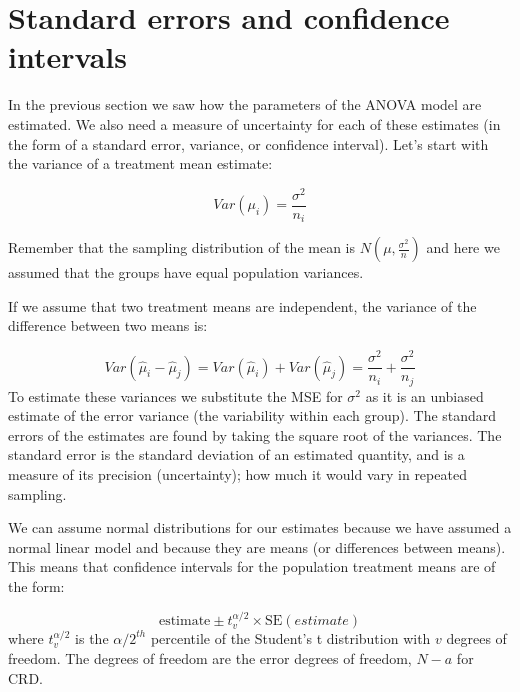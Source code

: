 \documentclass[
  letterpaper,
  DIV=11,
  numbers=noendperiod,
  oneside]{scrreprt}
\begin{document}
\section{Standard errors and confidence
intervals}\label{standard-errors-and-confidence-intervals}

In the previous section we saw how the parameters of the ANOVA model are
estimated. We also need a measure of uncertainty for each of these
estimates (in the form of a standard error, variance, or confidence
interval). Let's start with the variance of a treatment mean estimate:


\[Var(\mu_i) = \frac{\sigma^2}{n_i} \]

Remember that the sampling distribution of the mean is
\(N(\mu,\frac{\sigma^2}{n})\) and here we assumed that the groups have
equal population variances.

If we assume that two treatment means are independent, the variance of
the difference between two means is:

\[
Var(\hat{\mu}_i - \hat{\mu}_j) = Var(\hat{\mu}_i) + Var(\hat{\mu}_j) = \frac{\sigma^2}{n_i} + \frac{\sigma^2}{n_j}
\] To estimate these variances we substitute the MSE for \(\sigma^2\) as
it is an unbiased estimate of the error variance (the variability within
each group). The standard errors of the estimates are found by taking
the square root of the variances. The standard error is the standard
deviation of an estimated quantity, and is a measure of its precision
(uncertainty); how much it would vary in repeated sampling.

We can assume normal distributions for our estimates because we have
assumed a normal linear model and because they are means (or differences
between means). This means that confidence intervals for the population
treatment means are of the form:

\[ \text{estimate} \pm t^{\alpha/2}_v \times \text{SE}(estimate)\] where
\(t^{\alpha/2}_v\) is the \({\alpha/2}^{th}\) percentile of the
Student's t distribution with \(v\) degrees of freedom. The degrees of
freedom are the error degrees of freedom, \(N-a\) for CRD.
\end{document}

